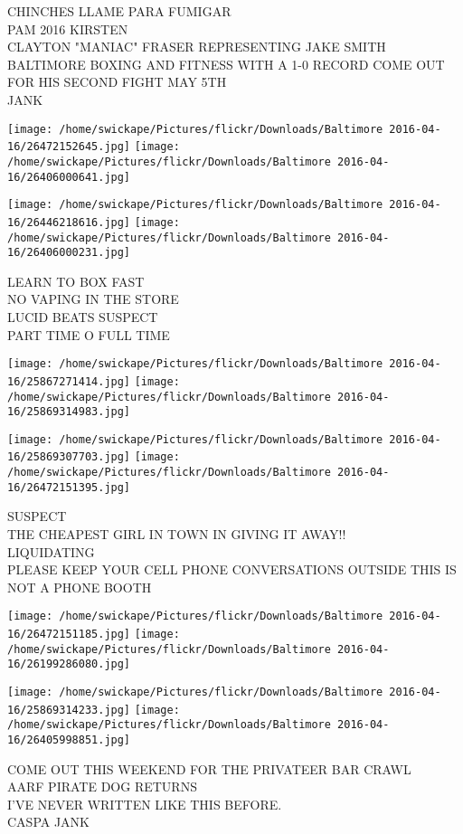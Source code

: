 \documentclass[10pt,letterpaper]{article}
\begin{document}
CHINCHES LLAME PARA FUMIGAR\\
PAM 2016 KIRSTEN\\
CLAYTON "MANIAC" FRASER REPRESENTING JAKE SMITH BALTIMORE BOXING AND FITNESS WITH A 1{-}0 RECORD COME OUT FOR HIS SECOND FIGHT MAY 5TH\\
JANK
\pagebreak

\texttt{[image: /home/swickape/Pictures/flickr/Downloads/Baltimore 2016-04-16/26472152645.jpg]}
\texttt{[image: /home/swickape/Pictures/flickr/Downloads/Baltimore 2016-04-16/26406000641.jpg]}

\texttt{[image: /home/swickape/Pictures/flickr/Downloads/Baltimore 2016-04-16/26446218616.jpg]}
\texttt{[image: /home/swickape/Pictures/flickr/Downloads/Baltimore 2016-04-16/26406000231.jpg]}

LEARN TO BOX FAST\\
NO VAPING IN THE STORE\\
LUCID BEATS SUSPECT\\
PART TIME O FULL TIME
\pagebreak

\texttt{[image: /home/swickape/Pictures/flickr/Downloads/Baltimore 2016-04-16/25867271414.jpg]}
\texttt{[image: /home/swickape/Pictures/flickr/Downloads/Baltimore 2016-04-16/25869314983.jpg]}

\texttt{[image: /home/swickape/Pictures/flickr/Downloads/Baltimore 2016-04-16/25869307703.jpg]}
\texttt{[image: /home/swickape/Pictures/flickr/Downloads/Baltimore 2016-04-16/26472151395.jpg]}

SUSPECT\\
THE CHEAPEST GIRL IN TOWN IN GIVING IT AWAY!!\\
LIQUIDATING\\
PLEASE KEEP YOUR CELL PHONE CONVERSATIONS OUTSIDE THIS IS NOT A PHONE BOOTH
\pagebreak

\texttt{[image: /home/swickape/Pictures/flickr/Downloads/Baltimore 2016-04-16/26472151185.jpg]}
\texttt{[image: /home/swickape/Pictures/flickr/Downloads/Baltimore 2016-04-16/26199286080.jpg]}

\texttt{[image: /home/swickape/Pictures/flickr/Downloads/Baltimore 2016-04-16/25869314233.jpg]}
\texttt{[image: /home/swickape/Pictures/flickr/Downloads/Baltimore 2016-04-16/26405998851.jpg]}

COME OUT THIS WEEKEND FOR THE PRIVATEER BAR CRAWL\\
AARF PIRATE DOG RETURNS\\
I'VE NEVER WRITTEN LIKE THIS BEFORE.\\
CASPA JANK
\pagebreak
\end{document}
